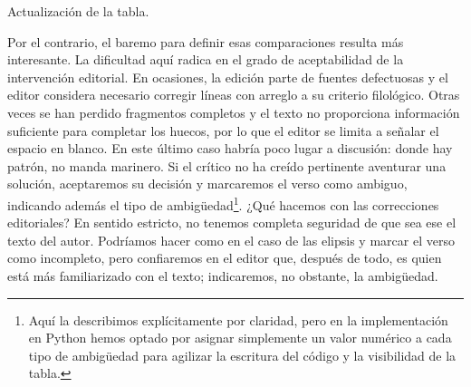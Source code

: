 \begin{algorithm}[!ht]
	\caption{Actualización de la tabla.}\label{list:actualizatabla}
	\Ffuncion{\ActualizaT{tabla, i, texto, personaje, esperadas}}{
		$\tabla_{i,personaje}$ \gets personaje \;
		\texto \gets \limpia{texto}\;
		\grandtotal \gets slbs(texto, esperadas)\;
		\uIf{\correcto{text} \is \KwSty{Verdadero}}{
			$\tabla_{i,s\acute{\imath}la}$  \gets $escansi\acute{o}n_{\acute{\imath}la}$ \;
			$\tabla_{i,n\acute{u}cl}$ \gets $escansi\acute{o}n_{n\acute{u}cl}$ \;
			$\tabla_{i,ritm}$ \gets $escansi\acute{o}n_{ritm}$ \;
			$\tabla_{i,cons}$ \gets $escansi\acute{o}n_{cons}$ \;
			$\tabla_{i,ason}$ \gets $escansi\acute{o}n_{ason}$ \;
			\If{
				[ $\in texto$
			}{
				$\tabla_{i,ambi}$ \gets edición
			}
			\Else{$\tabla_{i,ambi}$ \gets $escansi\acute{o}n_{ambi}$}

		}
		\uElse{
			\tabla$_{i,\text{síla}}$  \gets $\text{esperadas}_0$ \;
			\tabla$_{i,n\acute{u}cl}$ \gets $\emptyset$ \;
			\tabla$_{i,ritm}$ \gets $\emptyset$ \;
			\tabla$_{i,cons}$ \gets $escansi\acute{o}n_{cons}$ \;
			\tabla$_{i,ason}$ \gets $escansi\acute{o}n_{ason}$  \;
			\tabla$_{i,ambi}$ \gets $escansi\acute{o}n_{ambi}$  
		}
		\Return{tabla}
	}
\end{algorithm}
 Por el contrario, el baremo para definir esas comparaciones resulta más interesante. La dificultad aquí radica en el grado de aceptabilidad de la intervención editorial. En ocasiones, la edición parte de fuentes defectuosas y el editor considera necesario corregir líneas con arreglo a su criterio filológico. Otras veces se han perdido fragmentos completos y el texto no proporciona información suficiente para completar los huecos, por lo que el editor se limita a señalar el espacio en blanco. En este último caso habría poco lugar a discusión: donde hay patrón, no manda marinero. Si el crítico no ha creído pertinente aventurar una solución, aceptaremos su decisión y marcaremos el verso como ambiguo, indicando además el tipo de ambigüedad\footnote{Aquí la describimos explícitamente por claridad, pero en la implementación en Python hemos optado por asignar simplemente un valor numérico a cada tipo de ambigüedad para agilizar la escritura del código y la visibilidad de la tabla.}. ¿Qué hacemos con las correcciones editoriales? En sentido estricto, no tenemos completa seguridad de que sea ese el texto del autor. Podríamos hacer como en el caso de las elipsis y marcar el verso como  incompleto, pero confiaremos en el editor que, después de todo, es quien está más familiarizado con el texto; indicaremos, no obstante, la ambigüedad.
 
